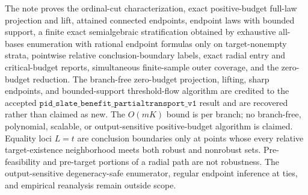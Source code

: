 \documentclass{article}
\begin{document}
The note proves the ordinal-cut characterization, exact positive-budget full-law projection and lift, attained connected endpoints, endpoint laws with bounded support, a finite exact semialgebraic stratification obtained by exhaustive all-bases enumeration with rational endpoint formulas only on target-nonempty strata, pointwise relative conclusion-boundary labels, exact radial entry and critical-budget reports, simultaneous finite-sample outer coverage, and the zero-budget reduction. The branch-free zero-budget projection, lifting, sharp endpoints, and bounded-support threshold-flow algorithm are credited to the accepted \(\texttt{pid\_slate\_benefit\_partialtransport\_v1}\) result and are recovered rather than claimed as new. The \(O(mK)\) bound is per branch; no branch-free, polynomial, scalable, or output-sensitive positive-budget algorithm is claimed. Equality loci \(L=t\) are conclusion boundaries only at points whose every relative target-existence neighborhood meets both robust and nonrobust sets. Pre-feasibility and pre-target portions of a radial path are not robustness. The output-sensitive degeneracy-safe enumerator, regular endpoint inference at ties, and empirical reanalysis remain outside scope.
\end{document}
